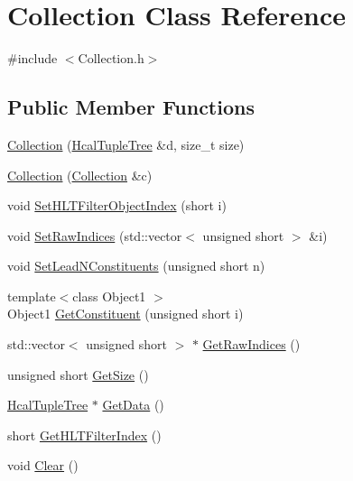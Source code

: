 \hypertarget{class_collection}{}\section{Collection Class Reference}
\label{class_collection}


{\ttfamily \#include $<$Collection.\+h$>$}

\subsection*{Public Member Functions}
\begin{DoxyCompactItemize}
\item 
\hyperlink{class_collection_aa21fbf1d352d860cc21d84eecd403654}{Collection} (\hyperlink{class_hcal_tuple_tree}{Hcal\+Tuple\+Tree} \&d, size\+\_\+t size)
\item 
\hyperlink{class_collection_a82ba2751d054a1dc20fe500b8a8043d4}{Collection} (\hyperlink{class_collection}{Collection} \&c)
\item 
void \hyperlink{class_collection_a199dd3f773ec714ad40748265de535e2}{Set\+H\+L\+T\+Filter\+Object\+Index} (short i)
\item 
void \hyperlink{class_collection_ac404569056596990e420a8640a217cb8}{Set\+Raw\+Indices} (std\+::vector$<$ unsigned short $>$ \&i)
\item 
void \hyperlink{class_collection_ae97a73b7e9a5f60fde5ce13ee1bb9b97}{Set\+Lead\+N\+Constituents} (unsigned short n)
\item 
{\footnotesize template$<$class Object1 $>$ }\\Object1 \hyperlink{class_collection_a89d0e41fed060e724ce4c219faa1e3fe}{Get\+Constituent} (unsigned short i)
\item 
std\+::vector$<$ unsigned short $>$ $\ast$ \hyperlink{class_collection_a6670bf82e20e49baddc03d39309bb8bd}{Get\+Raw\+Indices} ()
\item 
unsigned short \hyperlink{class_collection_a4dc8cd466f0ed9816d16f861117d8614}{Get\+Size} ()
\item 
\hyperlink{class_hcal_tuple_tree}{Hcal\+Tuple\+Tree} $\ast$ \hyperlink{class_collection_aec8babe811fce42f7cdbfa9204bb53d3}{Get\+Data} ()
\item 
short \hyperlink{class_collection_a7f4a06a68e1f4d159490cd7620e0f12c}{Get\+H\+L\+T\+Filter\+Index} ()
\item 
void \hyperlink{class_collection_aa70c30a22816d44da087195e9c3245f9}{Clear} ()
\item 

\end{DoxyCompactItemize}
